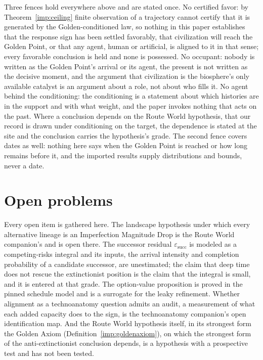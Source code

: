 Three fences hold everywhere above and are stated once. No certified
favor: by Theorem~\ref{imp:ceiling} finite observation of a trajectory
cannot certify that it is generated by the Golden-conditioned law, so
nothing in this paper establishes that the response sign has been
settled favorably, that civilization will reach the Golden Point, or
that any agent, human or artificial, is aligned to it in that sense;
every favorable conclusion is held and none is possessed.
No occupant: nobody is written as the Golden Point's arrival or its
agent, the present is not written as the decisive moment, and the
argument that civilization is the biosphere's only available catalyst
is an argument about a role, not about who fills it. No agent behind
the conditioning: the conditioning is a statement about which histories
are in the support and with what weight, and the paper invokes nothing
that acts on the past. Where a conclusion depends on the Route World
hypothesis, that our record is drawn under conditioning on the target,
the dependence is stated at the site and the conclusion carries the
hypothesis's grade.
The second fence covers dates as well: nothing here says when the
Golden Point is reached or how long remains before it, and the imported
results supply distributions and bounds, never a date.

\section{Open problems}\label{sec:open}

Every open item is gathered here. The landscape hypothesis under which
every alternative lineage is an Imperfection Magnitude Drop is the Route
World companion's and is open there. The successor residual
$\varepsilon_{\mathrm{succ}}$ is modeled as a competing-risks integral
and its inputs, the arrival intensity and completion probability of a
candidate successor, are unestimated; the claim that deep time does not
rescue the extinctionist position is the claim that the integral is
small, and it is entered at that grade. The option-value proposition is
proved in the pinned schedule model and is a surrogate for the leaky
refinement. Whether alignment as a technoanatomy question
admits an audit, a measurement of what each added capacity does to the
sign, is the technoanatomy companion's open identification map. And the
Route World hypothesis itself, in its strongest form the Golden Axiom
(Definition~\ref{imp:goldenaxiom}), on which the strongest form of the
anti-extinctionist conclusion depends, is a hypothesis with a
prospective test and has not been tested.

